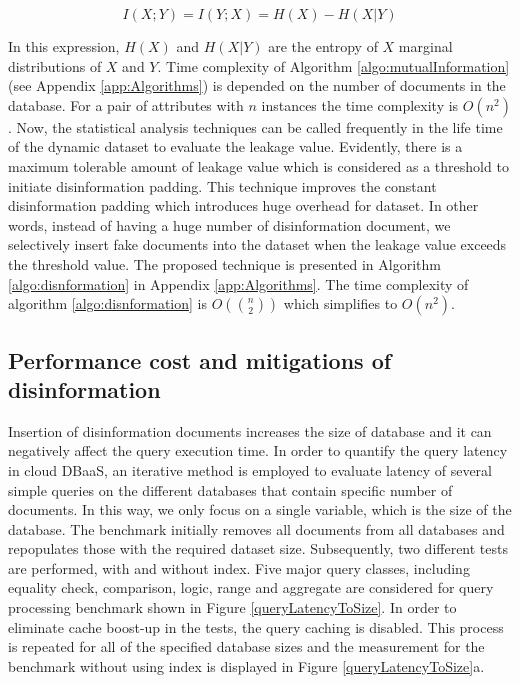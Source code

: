 \begin{equation} 
\label{eq:mutualInformation}
I(X; Y ) = I(Y; X)=H(X)-H(X|Y)
\end{equation} 

In this expression, $H\left(X\right)$ and $H\left(X|Y \right)$ are the entropy of $X$ marginal distributions of $X$ and $Y$. Time complexity of Algorithm \ref{algo:mutualInformation} (see Appendix \ref{app:Algorithms}) is depended on the number of documents in the database. For a pair of attributes with $n$ instances the time complexity is $O(n^2)$. Now, the statistical analysis techniques can be called frequently in the life time of the dynamic dataset to evaluate the leakage value. Evidently, there is a maximum tolerable amount of leakage value which is considered as a threshold to initiate disinformation padding. This technique improves the constant disinformation padding which introduces huge overhead for dataset. In other words, instead of having a huge number of disinformation document, we selectively insert fake documents into the dataset when the leakage value exceeds the threshold value. The proposed technique is presented in Algorithm \ref{algo:disnformation} in Appendix \ref{app:Algorithms}. The time complexity  of algorithm \ref{algo:disnformation} is $O(\binom n2)$ which simplifies to $O(n^2)$. 

\subsection{Performance cost and mitigations of disinformation}
\label{subsec:CostAndMitigationOfDisinfo}
Insertion of disinformation documents increases the size of database and it can negatively affect the query execution time. In order to quantify the query latency in cloud DBaaS, an iterative method is employed to evaluate latency of several simple queries on the different databases that contain specific number of documents. In this way, we only focus on a single variable, which is the size of the database. The benchmark initially removes all documents from all databases and repopulates those with the required dataset size. Subsequently, two different tests are performed, with and without index. Five major query classes, including equality check, comparison, logic, range and aggregate are considered for query processing benchmark shown in Figure \ref{queryLatencyToSize}. In order to eliminate cache boost-up in the tests, the query caching is disabled. This process is repeated for all of the specified database sizes and the measurement for the benchmark without using index is displayed in Figure \ref{queryLatencyToSize}a.\\


